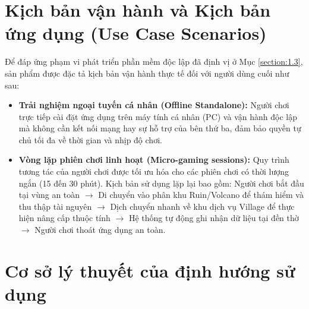 \documentclass[../DoAn.tex]{subfiles}
\begin{document}
\section{Kịch bản vận hành và Kịch bản ứng dụng (Use Case Scenarios)}
\label{section:2.4}

Để đáp ứng phạm vi phát triển phần mềm độc lập đã định vị ở Mục \ref{section:1.3}, sản phẩm được đặc tả kịch bản vận hành thực tế đối với người dùng cuối như sau:
\begin{itemize}
    \item \textbf{Trải nghiệm ngoại tuyến cá nhân (Offline Standalone):} Người chơi trực tiếp cài đặt ứng dụng trên máy tính cá nhân (PC) và vận hành độc lập mà không cần kết nối mạng hay sự hỗ trợ của bên thứ ba, đảm bảo quyền tự chủ tối đa về thời gian và nhịp độ chơi.
    \item \textbf{Vòng lặp phiên chơi linh hoạt (Micro-gaming sessions):} Quy trình tương tác của người chơi được tối ưu hóa cho các phiên chơi có thời lượng ngắn (15 đến 30 phút). Kịch bản sử dụng lặp lại bao gồm: Người chơi bắt đầu tại vùng an toàn $\rightarrow$ Di chuyển vào phân khu Ruin/Volcano để thám hiểm và thu thập tài nguyên $\rightarrow$ Dịch chuyển nhanh về khu dịch vụ Village để thực hiện nâng cấp thuộc tính $\rightarrow$ Hệ thống tự động ghi nhận dữ liệu tại đền thờ $\rightarrow$ Người chơi thoát ứng dụng an toàn.
\end{itemize}


\section{Cơ sở lý thuyết của định hướng sử dụng}
\label{section:2.5}
\end{document}
